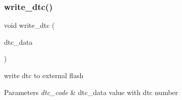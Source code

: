 \subsubsection{\texorpdfstring{write\+\_\+dtc()}{write\_dtc()}}
{\footnotesize\ttfamily void write\+\_\+dtc (\begin{DoxyParamCaption}\item[{dtc\+\_\+data}]{ }\end{DoxyParamCaption})}



write dtc to external flash 


\begin{DoxyParams}{Parameters}
{\em dtc\+\_\+code} & dtc\+\_\+data value with dtc number \\
\hline
\end{DoxyParams}
